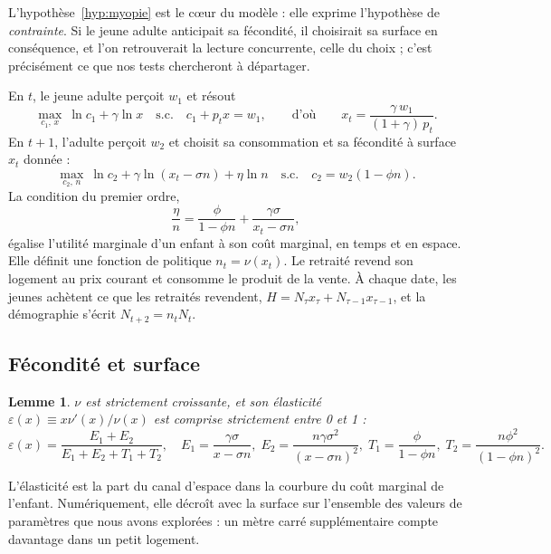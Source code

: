 \documentclass[11pt,a4paper]{article}
\theoremstyle{plain}
\newtheorem{lemme}{Lemme}
\theoremstyle{definition}
\theoremstyle{remark}
\newcommand{\eps}{\varepsilon}
\begin{document}
L'hypothèse~\ref{hyp:myopie} est le cœur du modèle : elle exprime l'hypothèse de \emph{contrainte}. Si le jeune adulte anticipait sa fécondité, il choisirait sa surface en conséquence, et l'on retrouverait la lecture concurrente, celle du choix ; c'est précisément ce que nos tests chercheront à départager.

En $t$, le jeune adulte perçoit $w_1$ et résout
\begin{equation}\label{eq:P1}
\max_{c_1,\,x}\ \ln c_1 + \gamma \ln x \quad \text{s.c.} \quad c_1 + p_t x = w_1,
\qquad\text{d'où}\qquad x_t = \frac{\gamma\, w_1}{(1+\gamma)\, p_t}.
\end{equation}
En $t+1$, l'adulte perçoit $w_2$ et choisit sa consommation et sa fécondité à surface $x_t$ donnée :
\begin{equation}\label{eq:P2}
\max_{c_2,\,n}\ \ln c_2 + \gamma \ln(x_t - \sigma n) + \eta \ln n \quad \text{s.c.} \quad c_2 = w_2(1-\phi n).
\end{equation}
La condition du premier ordre,
\begin{equation}\label{eq:foc}
\frac{\eta}{n} = \frac{\phi}{1-\phi n} + \frac{\gamma\sigma}{x_t - \sigma n},
\end{equation}
égalise l'utilité marginale d'un enfant à son coût marginal, en temps et en espace. Elle définit une fonction de politique $n_t = \nu(x_t)$. Le retraité revend son logement au prix courant et consomme le produit de la vente. À chaque date, les jeunes achètent ce que les retraités revendent, $H = N_\tau x_\tau + N_{\tau-1} x_{\tau-1}$, et la démographie s'écrit $N_{t+2} = n_t N_t$.

\subsection{Fécondité et surface}

\begin{lemme}\label{lem:nu}
$\nu$ est strictement croissante, et son élasticité $\eps(x) \equiv x\nu'(x)/\nu(x)$ est comprise strictement entre 0 et 1 :
\[
\eps(x) = \frac{E_1+E_2}{E_1+E_2+T_1+T_2}, \quad
E_1 = \frac{\gamma\sigma}{x-\sigma n},\;
E_2 = \frac{n\gamma\sigma^2}{(x-\sigma n)^2},\;
T_1 = \frac{\phi}{1-\phi n},\;
T_2 = \frac{n\phi^2}{(1-\phi n)^2}.
\]
\end{lemme}

L'élasticité est la part du canal d'espace dans la courbure du coût marginal de l'enfant. Numériquement, elle décroît avec la surface sur l'ensemble des valeurs de paramètres que nous avons explorées : un mètre carré supplémentaire compte davantage dans un petit logement.
\end{document}
